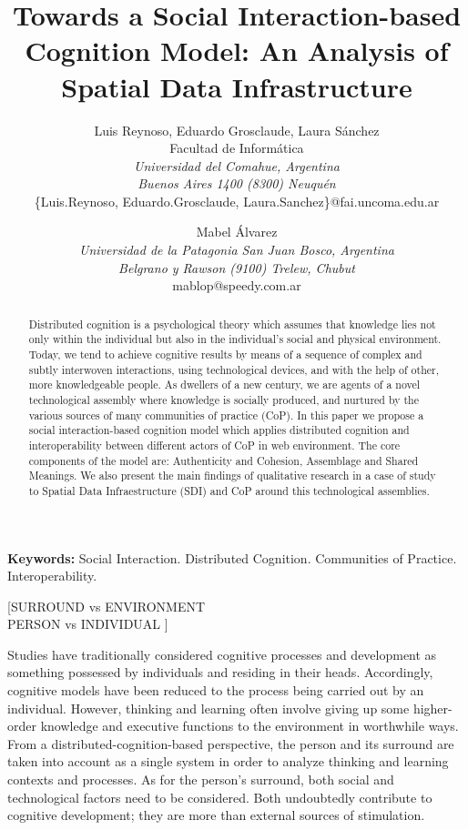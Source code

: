 \documentclass[10pt,twocolumn,ieeetran]{article}
\title{Towards a Social Interaction-based Cognition Model: An Analysis of Spatial Data Infrastructure}
\author{Luis Reynoso, Eduardo Grosclaude, Laura S\' anchez \\
Facultad de Inform\' atica\\ {\it Universidad del Comahue, Argentina} \\
{\it Buenos Aires 1400 (8300) Neuqu\'en}\\ \{Luis.Reynoso, Eduardo.Grosclaude,  Laura.Sanchez\}@fai.uncoma.edu.ar\\
\and
Mabel \' Alvarez\\
{\it Universidad de la Patagonia San Juan Bosco, Argentina}\\
{\it Belgrano y Rawson (9100) Trelew, Chubut}\\
mablop@speedy.com.ar\\
}
\newcommand{\nota}[1]{{\color{red}[#1]}}
\begin{document}
\maketitle
\thispagestyle{empty}




\begin{abstract}
Distributed cognition is a psychological theory which assumes that knowledge lies not only within the individual but also in the individual's social and physical environment. Today, we tend to achieve cognitive results by means of a sequence of complex and subtly interwoven interactions, using  technological devices, and with the help of other, more knowledgeable people. As dwellers of a new century, we are agents of a novel technological assembly where knowledge is socially produced, and nurtured by the various sources of many communities of practice (CoP). In this paper we propose a social interaction-based cognition model which applies distributed cognition and interoperability between different actors of CoP in web environment. The core components of the model are: Authenticity and Cohesion, Assemblage and Shared Meanings. We also present the main findings of qualitative research in a case of study to Spatial Data Infraestructure (SDI) and CoP around this technological assemblies. 

\end{abstract}

{\bf Keywords:} Social Interaction. Distributed Cognition. Communities of Practice. Interoperability. 



\nota{SURROUND vs ENVIRONMENT\\
PERSON vs INDIVIDUAL
}

Studies have traditionally considered cognitive processes \cite {Wang2005} and development as something possessed by individuals and residing in their heads. Accordingly, cognitive models have been reduced to the process being carried out by an individual.  
However, thinking and learning often involve giving up some higher-order knowledge and executive functions to the environment in worthwhile ways. 
From a distributed-cognition-based perspective, 
the person and its surround are taken into account as a single system 
in order to analyze  thinking and learning contexts and processes. 
As for the person's surround, both social and technological factors need to be considered. Both undoubtedly contribute to cognitive development; they are more than external sources of stimulation.
\end{document}
